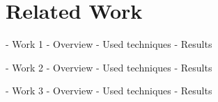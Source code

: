 \chapter{Related Work} \label{cpt-related-work}



- Work 1
    - Overview
    - Used techniques
    - Results

- Work 2
    - Overview
    - Used techniques
    - Results

- Work 3
    - Overview
    - Used techniques
    - Results
